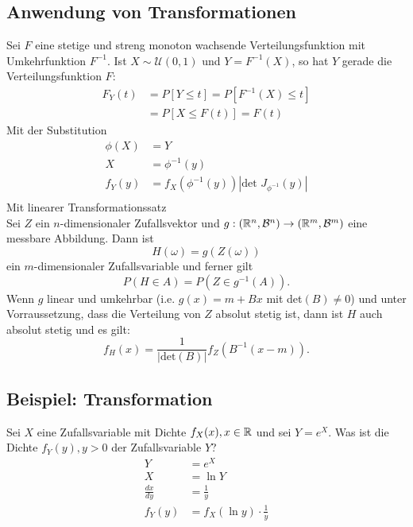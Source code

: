 \subsection{Anwendung von Transformationen}
Sei $F$ eine stetige und streng monoton wachsende Verteilungsfunktion mit
Umkehrfunktion $F^{-1}$. Ist $X \sim \mathcal{U} (0, 1)$ und $Y = F^{-1} (X)$,
so hat $Y$ gerade die Verteilungsfunktion $F$:
\begin{align*}
  F_Y (t) & = P[Y \leq t] = P[F^{-1} (X) \leq t] \\
          & = P[X \leq F (t)] = F (t)
\end{align*}
Mit der Substitution
\begin{align*}
  \phi(X) & = Y                                              \\
  X       & = \phi^{-1}(y)                                   \\
  f_Y(y)  & = f_X(\phi^{-1}(y))|\text{det }J_{\phi^{-1}}(y)| \\
\end{align*}
Mit linearer Transformationssatz\\
Sei $Z$ ein $n$-dimensionaler Zufallsvektor und $g: (\mathbb{R}^n, \mathcal{B}^n) \to (\mathbb{R}^m, \mathcal{B}^m)$ eine messbare Abbildung. Dann ist
$$H(\omega) = g(Z(\omega))$$
ein $m$-dimensionaler Zufallsvariable und ferner gilt
$$P(H \in A) = P(Z \in g^{-1}(A)).$$
Wenn $g$ linear und umkehrbar (i.e. $g(x) = m + Bx$ mit det$(B) \neq 0$) und unter Vorraussetzung, dass die Verteilung von $Z$ absolut stetig ist, dann ist $H$ auch absolut stetig und es gilt:
$$f_H(x)=\frac{1}{|\text{det}(B)|}f_Z(B^{-1}(x-m)).$$
\BoxStart{}
\subsection{Beispiel: Transformation}
Sei $X$ eine Zufallsvariable mit Dichte $f_X(x), x \in \mathbb{R}$ und sei $Y = e^X$. Was ist die Dichte $f_Y(y), y > 0$ der Zufallsvariable $Y$?
\begin{align*}
  Y             & = e^X                          \\
  X             & = \ln Y                        \\
  \frac{dx}{dy} & = \frac{1}{y}                  \\
  f_Y(y)        & = f_X(\ln y) \cdot \frac{1}{y} \\
\end{align*}

\BoxEnd{}
